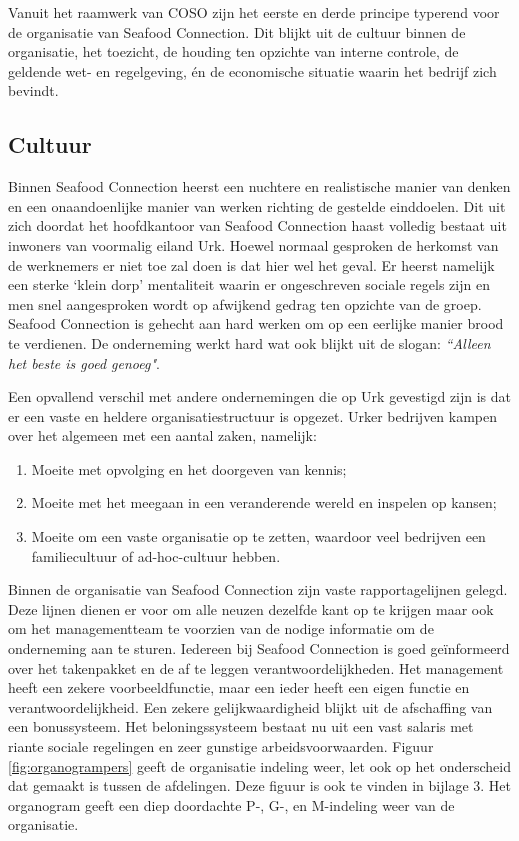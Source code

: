 Vanuit het raamwerk van COSO zijn het eerste en derde principe typerend voor de organisatie van Seafood Connection. Dit blijkt uit de cultuur binnen de organisatie, het toezicht, de houding ten opzichte van interne controle, de geldende wet- en regelgeving, én de economische situatie waarin het bedrijf zich bevindt. 

\newpage 
\subsection{Cultuur}
Binnen Seafood Connection heerst een nuchtere en realistische manier van denken en een onaandoenlijke manier van werken richting de gestelde einddoelen. Dit uit zich doordat het hoofdkantoor van Seafood Connection haast volledig bestaat uit inwoners van voormalig eiland Urk. Hoewel normaal gesproken de herkomst van de werknemers er niet toe zal doen is dat hier wel het geval. Er heerst namelijk een sterke `klein dorp' mentaliteit waarin er ongeschreven sociale regels zijn en men snel aangesproken wordt op afwijkend gedrag ten opzichte van de groep. Seafood Connection is gehecht aan hard werken om op een eerlijke manier brood te verdienen. De onderneming werkt hard wat ook blijkt uit de slogan: \textit{``Alleen het beste is goed genoeg"}. \citep{sfcwebsite,quickscan} 

Een opvallend verschil met andere ondernemingen die op Urk gevestigd zijn is dat er een vaste en heldere organisatiestructuur is opgezet. Urker bedrijven kampen over het algemeen met een aantal zaken, namelijk:

\begin{enumerate}
    \item Moeite met opvolging en het doorgeven van kennis;
    \item Moeite met het meegaan in een veranderende wereld en inspelen op kansen;
    \item Moeite om een vaste organisatie op te zetten, waardoor veel bedrijven een familiecultuur of ad-hoc-cultuur hebben.
\end{enumerate}

Binnen de organisatie van Seafood Connection zijn vaste rapportagelijnen gelegd. Deze lijnen dienen er voor om alle neuzen dezelfde kant op te krijgen maar ook om het managementteam te voorzien van de nodige informatie om de onderneming aan te sturen. Iedereen bij Seafood Connection is goed geïnformeerd over het takenpakket en de af te leggen verantwoordelijkheden. Het management heeft een zekere voorbeeldfunctie, maar een ieder heeft een eigen functie en verantwoordelijkheid. Een zekere gelijkwaardigheid blijkt uit de afschaffing van een bonussysteem. Het beloningssysteem bestaat nu uit een vast salaris met riante sociale regelingen en zeer gunstige arbeidsvoorwaarden. Figuur \ref{fig:organogrampers} geeft de organisatie indeling weer, let ook op het onderscheid dat gemaakt is tussen de afdelingen. Deze figuur is ook te vinden in bijlage 3. Het organogram geeft een diep doordachte P-, G-, en M-indeling weer van de organisatie. \citep{quickscan}

